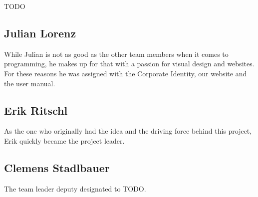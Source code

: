 TODO

\subsection{Julian Lorenz}

While Julian is not as good as the other team members when it comes to
programming, he makes up for that with a passion for visual design and
websites. For these reasons he was assigned with the Corporate Identity, our
website and the user manual.

\subsection{Erik Ritschl}

As the one who originally had the idea and the driving force behind this
project, Erik quickly became the project leader.

\subsection{Clemens Stadlbauer}
The team leader deputy designated to TODO.
